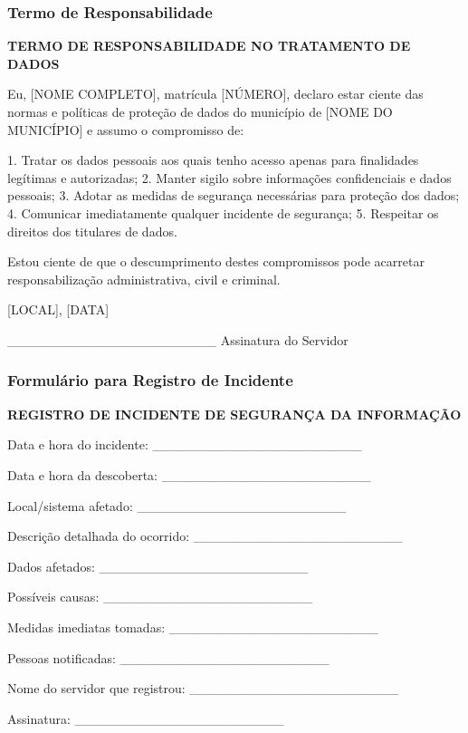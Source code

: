 \documentclass[12pt,a4paper]{article}
\begin{document}
\subsubsection{Termo de Responsabilidade}
\begin{tcolorbox}[colback=white, colframe=black]
\textbf{TERMO DE RESPONSABILIDADE NO TRATAMENTO DE DADOS}

Eu, [NOME COMPLETO], matrícula [NÚMERO], declaro estar ciente das normas e políticas de proteção de dados do município de [NOME DO MUNICÍPIO] e assumo o compromisso de:

1. Tratar os dados pessoais aos quais tenho acesso apenas para finalidades legítimas e autorizadas;
2. Manter sigilo sobre informações confidenciais e dados pessoais;
3. Adotar as medidas de segurança necessárias para proteção dos dados;
4. Comunicar imediatamente qualquer incidente de segurança;
5. Respeitar os direitos dos titulares de dados.

Estou ciente de que o descumprimento destes compromissos pode acarretar responsabilização administrativa, civil e criminal.

[LOCAL], [DATA]

\_\_\_\_\_\_\_\_\_\_\_\_\_\_\_\_\_\_\_\_\_\_
Assinatura do Servidor
\end{tcolorbox}

\subsubsection{Formulário para Registro de Incidente}
\begin{tcolorbox}[colback=white, colframe=black]
\textbf{REGISTRO DE INCIDENTE DE SEGURANÇA DA INFORMAÇÃO}

Data e hora do incidente: \_\_\_\_\_\_\_\_\_\_\_\_\_\_\_\_\_\_\_\_\_\_

Data e hora da descoberta: \_\_\_\_\_\_\_\_\_\_\_\_\_\_\_\_\_\_\_\_\_\_

Local/sistema afetado: \_\_\_\_\_\_\_\_\_\_\_\_\_\_\_\_\_\_\_\_\_\_

Descrição detalhada do ocorrido: \_\_\_\_\_\_\_\_\_\_\_\_\_\_\_\_\_\_\_\_\_\_

Dados afetados: \_\_\_\_\_\_\_\_\_\_\_\_\_\_\_\_\_\_\_\_\_\_

Possíveis causas: \_\_\_\_\_\_\_\_\_\_\_\_\_\_\_\_\_\_\_\_\_\_

Medidas imediatas tomadas: \_\_\_\_\_\_\_\_\_\_\_\_\_\_\_\_\_\_\_\_\_\_

Pessoas notificadas: \_\_\_\_\_\_\_\_\_\_\_\_\_\_\_\_\_\_\_\_\_\_

Nome do servidor que registrou: \_\_\_\_\_\_\_\_\_\_\_\_\_\_\_\_\_\_\_\_\_\_

Assinatura: \_\_\_\_\_\_\_\_\_\_\_\_\_\_\_\_\_\_\_\_\_\_
\end{tcolorbox}
\end{document}
